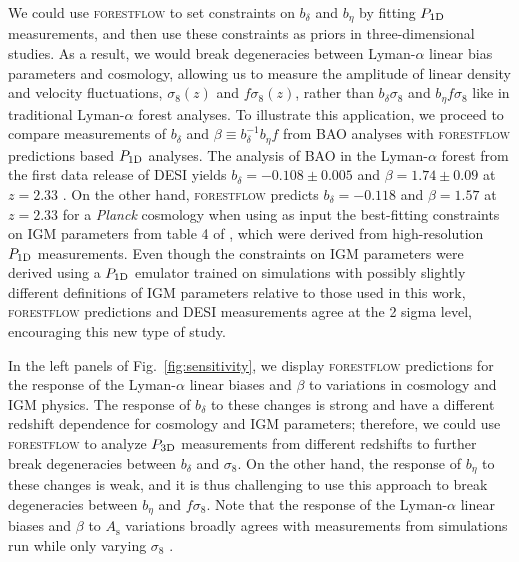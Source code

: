\documentclass{aa}
\newcommand{\lya}{Lyman-$\alpha$\xspace}
\newcommand{\lyaf}{Lyman-$\alpha$ forest\xspace}
\newcommand{\poned}{\ensuremath{P_{\rm 1D}}\xspace}
\newcommand{\pthreed}{\ensuremath{P_{\rm 3D}}\xspace}
\newcommand{\forestflow}{\textsc{forestflow}\xspace}
\begin{document}
We could use \forestflow to set constraints on $b_\delta$ and $b_\eta$ by fitting \poned measurements, and then use these constraints as priors in three-dimensional studies. As a result, we would break degeneracies between \lya linear bias parameters and cosmology, allowing us to measure the amplitude of linear density and velocity fluctuations, $\sigma_8(z)$ and $f \sigma_8(z)$, rather than $b_\delta \sigma_8$ and $b_\eta f \sigma_8$ like in traditional \lyaf analyses. To illustrate this application, we proceed to compare measurements of $b_\delta$ and $\beta\equiv b_\delta^{-1} b_\eta f$ from BAO analyses with \forestflow predictions based \poned analyses. The analysis of BAO in the \lyaf from the first data release of DESI yields $b_\delta=-0.108\pm0.005$ and $\beta=1.74\pm0.09$ at $z=2.33$ \citep{desicollaboration2024DESI2024IV}. On the other hand, \forestflow predicts $b_\delta=-0.118$ and $\beta=1.57$ at $z=2.33$ for a {\it Planck} cosmology when using as input the best-fitting constraints on IGM parameters from table 4 of \citet{emugp_Walther2019}, which were derived from high-resolution \poned measurements. Even though the constraints on IGM parameters were derived using a \poned emulator trained on simulations with possibly slightly different definitions of IGM parameters relative to those used in this work, \forestflow predictions and DESI measurements agree at the 2 sigma level, encouraging this new type of study.

In the left panels of Fig.~\ref{fig:sensitivity}, we display \forestflow predictions for the response of the \lya linear biases and $\beta$ to variations in cosmology and IGM physics. The response of $b_\delta$ to these changes is strong and have a different redshift dependence for cosmology and IGM parameters; therefore, we could use \forestflow to analyze \pthreed measurements from different redshifts to further break degeneracies between $b_\delta$ and $\sigma_8$. On the other hand, the response of $b_\eta$ to these changes is weak, and it is thus challenging to use this approach to break degeneracies between $b_\eta$ and $f \sigma_8$. Note that the response of the \lya linear biases and $\beta$ to $A_\mathrm{s}$ variations broadly agrees with measurements from simulations run while only varying $\sigma_8$ \citep{arinyo-i-prats2015NonlinearPowerSpectrum}.
\end{document}
